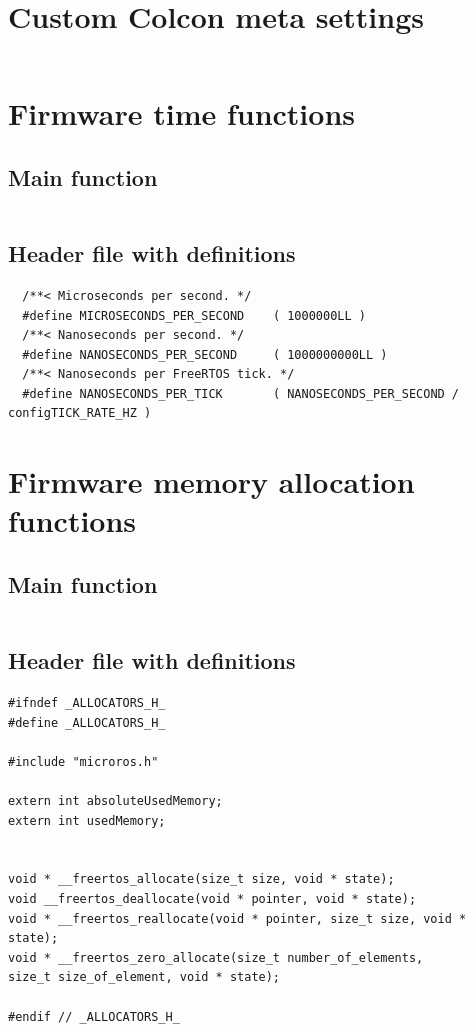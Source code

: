 \documentclass[10pt]{article}
\begin{document}
\pagebreak
\section{Custom Colcon meta settings}
\label{sec:colconsettings}
\inputminted[linenos]{yaml}{./src/custom_r5f_colcon.meta}

\pagebreak
\section{Firmware time functions}
\label{sec:timefunctions}

\subsection{Main function}
\inputminted[linenos]{c}{./src/clock.c}

\subsection{Header file with definitions}
\begin{verbatim}
  /**< Microseconds per second. */
  #define MICROSECONDS_PER_SECOND    ( 1000000LL )  
  /**< Nanoseconds per second. */
  #define NANOSECONDS_PER_SECOND     ( 1000000000LL ) 
  /**< Nanoseconds per FreeRTOS tick. */  
  #define NANOSECONDS_PER_TICK       ( NANOSECONDS_PER_SECOND / configTICK_RATE_HZ ) 
\end{verbatim}


\pagebreak
\section{Firmware memory allocation functions}
\label{sec:allocfunctions}

\subsection{Main function}
\inputminted[linenos]{c}{./src/allocators.c}

\subsection{Header file with definitions}
\begin{verbatim}
#ifndef _ALLOCATORS_H_
#define _ALLOCATORS_H_

#include "microros.h"

extern int absoluteUsedMemory;
extern int usedMemory;


void * __freertos_allocate(size_t size, void * state);
void __freertos_deallocate(void * pointer, void * state);
void * __freertos_reallocate(void * pointer, size_t size, void * state);
void * __freertos_zero_allocate(size_t number_of_elements,
size_t size_of_element, void * state);

#endif // _ALLOCATORS_H_
\end{verbatim}
\end{document}
